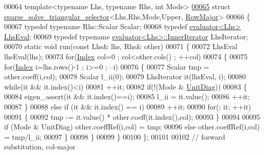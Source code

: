 \begin{DoxyCode}
00064 \textcolor{keyword}{template}<\textcolor{keyword}{typename} Lhs, \textcolor{keyword}{typename} Rhs, \textcolor{keywordtype}{int} Mode>
\hyperlink{struct_eigen_1_1internal_1_1sparse__solve__triangular__selector_3_01_lhs_00_01_rhs_00_01_mode_00_01_upper_00_01_row_major_01_4}{00065} \textcolor{keyword}{struct }\hyperlink{struct_eigen_1_1internal_1_1sparse__solve__triangular__selector}{sparse\_solve\_triangular\_selector}<Lhs,Rhs,Mode,Upper,
      \hyperlink{group__enums_ggaacded1a18ae58b0f554751f6cdf9eb13acfcde9cd8677c5f7caf6bd603666aae3}{RowMajor}>
00066 \{
00067   \textcolor{keyword}{typedef} \textcolor{keyword}{typename} Rhs::Scalar Scalar;
00068   \textcolor{keyword}{typedef} \hyperlink{struct_eigen_1_1internal_1_1evaluator}{evaluator<Lhs>} \hyperlink{struct_eigen_1_1internal_1_1evaluator}{LhsEval};
00069   \textcolor{keyword}{typedef} \textcolor{keyword}{typename} \hyperlink{struct_eigen_1_1internal_1_1evaluator}{evaluator<Lhs>::InnerIterator} LhsIterator;
00070   \textcolor{keyword}{static} \textcolor{keywordtype}{void} run(\textcolor{keyword}{const} Lhs& lhs, Rhs& other)
00071   \{
00072     LhsEval lhsEval(lhs);
00073     \textcolor{keywordflow}{for}(\hyperlink{namespace_eigen_a62e77e0933482dafde8fe197d9a2cfde}{Index} col=0 ; col<other.cols() ; ++col)
00074     \{
00075       \textcolor{keywordflow}{for}(\hyperlink{namespace_eigen_a62e77e0933482dafde8fe197d9a2cfde}{Index} i=lhs.rows()-1 ; i>=0 ; --i)
00076       \{
00077         Scalar tmp = other.coeff(i,col);
00078         Scalar l\_ii(0);
00079         LhsIterator it(lhsEval, i);
00080         \textcolor{keywordflow}{while}(it && it.index()<i)
00081           ++it;
00082         \textcolor{keywordflow}{if}(!(Mode & \hyperlink{group__enums_gga39e3366ff5554d731e7dc8bb642f83cdaddb72f888ac85d5a1c52333e54f9374b}{UnitDiag}))
00083         \{
00084           eigen\_assert(it && it.index()==i);
00085           l\_ii = it.value();
00086           ++it;
00087         \}
00088         \textcolor{keywordflow}{else} \textcolor{keywordflow}{if} (it && it.index() == i)
00089           ++it;
00090         \textcolor{keywordflow}{for}(; it; ++it)
00091         \{
00092           tmp -= it.value() * other.coeff(it.index(),col);
00093         \}
00094 
00095         \textcolor{keywordflow}{if} (Mode & UnitDiag)  other.coeffRef(i,col) = tmp;
00096         \textcolor{keywordflow}{else}                  other.coeffRef(i,col) = tmp/l\_ii;
00097       \}
00098     \}
00099   \}
00100 \};
00101 
00102 \textcolor{comment}{// forward substitution, col-major}

\end{DoxyCode}

